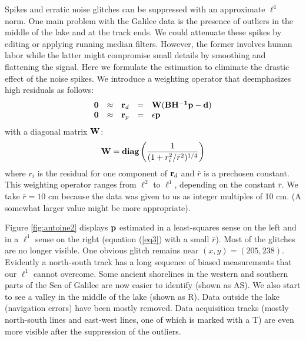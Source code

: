 Spikes and erratic noise glitches can be suppressed
with an approximate $\ell^1$ norm.
One main problem with the Galilee data is the presence of outliers
in the middle of the lake and at the track ends.
We could attenuate these spikes by editing or applying running median filters.
However, the former involves human labor
while the latter might compromise small details
by smoothing and flattening the signal.
Here we formulate the estimation
to eliminate the drastic effect of the noise spikes.
We introduce a weighting operator that deemphasizes high residuals as follows:
\begin{equation}
  \begin{array}{lllll}
    \bold 0 &\approx& \bold r_d &=& \bold W ( \bold B \bold {H^{-1}} \bold p - \bold d
    )\\
    \bold 0 &\approx&  \bold r_p &=& \epsilon \bold p
  \end{array} \label{eq3}
\end{equation}
with a diagonal matrix $\bf{W}$:
\begin{equation}
{\bf W} = {\bf diag} \left( \frac{1}{(1+r_i^2/\bar{r}^2)^{1/4}} \right)
\end{equation}
where $r_i$ is the residual for one component of $\bold r_d$
and $\bar{r}$ is a prechosen constant. This weighting operator
ranges from $\ell^2$ to $\ell^1$, depending on the constant $\bar{r}$.
We take $\bar{r}=10$ cm
because the data was given to us as integer multiples of 10 cm.
(A somewhat larger value might be more appropriate).




\par
Figure \ref{fig:antoine2} displays ${\bf p}$ estimated 
in a least-squares sense on the left and in a $\ell^1$ sense on the right 
(equation (\ref{eq3}) with a small $\bar{r}$).
Most of the glitches are no longer visible.
One obvious glitch remains near $(x,y)=(205,238)$.
Evidently a north-south track has a long sequence of biased measurements
that our $\ell^1$ cannot overcome.
Some ancient shorelines in the western and southern parts of the Sea of
Galilee are now easier to identify (shown as AS).
We also start to see a valley in the middle of the lake (shown as R). 
Data outside the lake (navigation errors) have been mostly removed.
Data acquisition tracks (mostly north-south lines and east-west lines,
one of which is marked with a T)
are even more visible after the suppression of the outliers.


